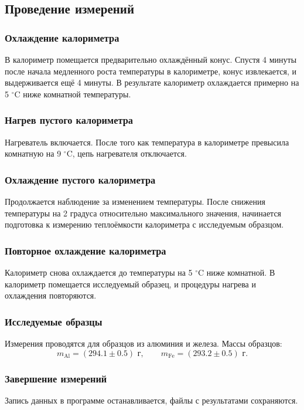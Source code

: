 \documentclass[a4paper,12pt]{article}
\begin{document}
\subsection{Проведение измерений}

\subsubsection{Охлаждение калориметра}
В калориметр помещается предварительно охлаждённый конус. Спустя 4 минуты после начала медленного роста температуры в калориметре, конус извлекается, и выдерживается ещё 4 минуты. В результате калориметр охлаждается примерно на 5 $^\circ$C ниже комнатной температуры.

\subsubsection{Нагрев пустого калориметра}
Нагреватель включается. После того как температура в калориметре превысила комнатную на 9 $^\circ$C, цепь нагревателя отключается.

\subsubsection{Охлаждение пустого калориметра}
Продолжается наблюдение за изменением температуры. После снижения температуры на 2 градуса относительно максимального значения, начинается подготовка к измерению теплоёмкости калориметра с исследуемым образцом.

\subsubsection{Повторное охлаждение калориметра}
Калориметр снова охлаждается до температуры на 5 $^\circ$C ниже комнатной. В калориметр помещается исследуемый образец, и процедуры нагрева и охлаждения повторяются.

\subsubsection{Исследуемые образцы}
Измерения проводятся для образцов из алюминия и железа. Массы образцов:
\begin{equation}
    m_{\text{Al}} = (294.1 \pm 0.5) \text{ г}, \qquad m_{\text{Fe}} = (293.2 \pm 0.5) \text{ г}.
\end{equation}

\subsubsection{Завершение измерений}
Запись данных в программе останавливается, файлы с результатами сохраняются.
\end{document}
